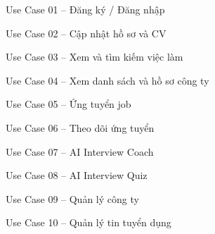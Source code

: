 \documentclass[../DoAn.tex]{subfiles}
\begin{document}
\begin{figure}[H]\centering{}\caption{Use Case 01 -- Đăng ký / Đăng nhập}\label{fig:usecase-01}\end{figure}
\begin{figure}[H]\centering{}\caption{Use Case 02 -- Cập nhật hồ sơ và CV}\label{fig:usecase-02}\end{figure}
\begin{figure}[H]\centering{}\caption{Use Case 03 -- Xem và tìm kiếm việc làm}\label{fig:usecase-03}\end{figure}
\begin{figure}[H]\centering{}\caption{Use Case 04 -- Xem danh sách và hồ sơ công ty}\label{fig:usecase-04}\end{figure}
\begin{figure}[H]\centering{}\caption{Use Case 05 -- Ứng tuyển job}\label{fig:usecase-05}\end{figure}
\begin{figure}[H]\centering{}\caption{Use Case 06 -- Theo dõi ứng tuyển}\label{fig:usecase-06}\end{figure}
\begin{figure}[H]\centering{}\caption{Use Case 07 -- AI Interview Coach}\label{fig:usecase-07}\end{figure}
\begin{figure}[H]\centering{}\caption{Use Case 08 -- AI Interview Quiz}\label{fig:usecase-08}\end{figure}
\begin{figure}[H]\centering{}\caption{Use Case 09 -- Quản lý công ty}\label{fig:usecase-09}\end{figure}
\begin{figure}[H]\centering{}\caption{Use Case 10 -- Quản lý tin tuyển dụng}\label{fig:usecase-10}\end{figure}
\end{document}
